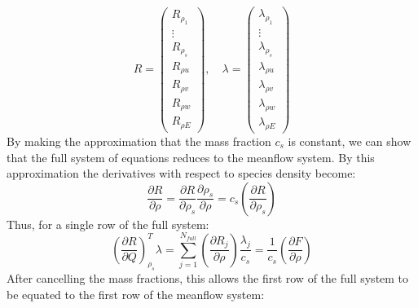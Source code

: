 \begin{equation}
  R = \begin{pmatrix} 
        R_{\rho_1} \\ \vdots \\ R_{\rho_s} \\ R_{\rho u} \\
        R_{\rho v} \\ R_{\rho w} \\ R_{\rho E}
      \end{pmatrix}, \quad
      \lambda = \begin{pmatrix}
        \lambda_{\rho_1} \\ \vdots \\ \lambda_{\rho_s} \\
        \lambda_{\rho u} \\ \lambda_{\rho v} \\ \lambda_{\rho w} \\
        \lambda_{\rho E}
      \end{pmatrix}
  \label{full_sys}
\end{equation}
By making the approximation that the mass fraction $c_s$ is constant, we can show that the full system of equations reduces to the meanflow system.  By this approximation the derivatives with respect to species density become:
\begin{equation}
  \frac{\partial R}{\partial \rho} =
  \frac{\partial R}{\partial \rho_s} 
  \frac{\partial \rho_s}{\partial \rho} =
  c_s\left(\frac{\partial R}{\partial \rho_s}\right)
  \label{mass_frac_approx}
\end{equation}
Thus, for a single row of the full system:
\begin{equation}
  \left(\frac{\partial R}{\partial Q}\right)_{\rho_s}^T \lambda 
  = \sum_{j=1}^{N_{full}}{
    \left(\frac{\partial R_j}{\partial \rho}\right) \frac{\lambda_j}{c_s}}
    = \frac{1}{c_s}\left(\frac{\partial F}{\partial \rho}\right)
  \label{full_reduction}
\end{equation}
After cancelling the mass fractions, this allows the first row of the full system to be equated to the first row of the meanflow system:
